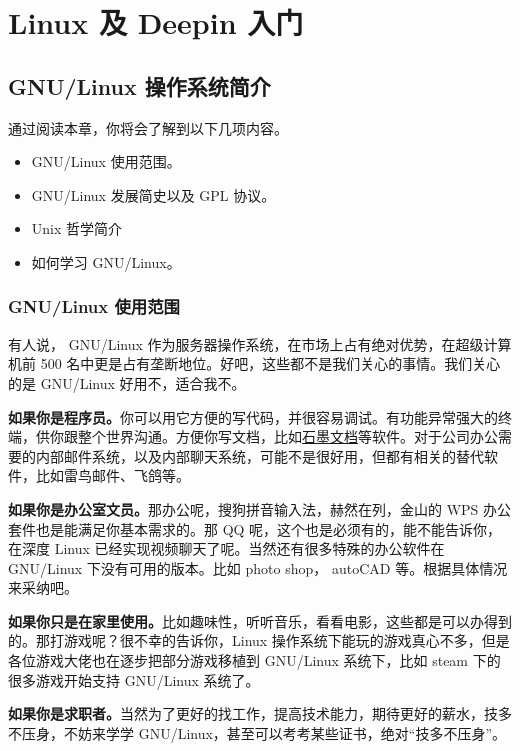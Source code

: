 \documentclass[doctor,openright,twoside]{sjtuthesis}
\providecommand{\tightlist}{%
    \setlength{\itemsep}{0pt}\setlength{\parskip}{0pt}}
\theoremstyle{plain}
\theoremstyle{definition}
\theoremstyle{remark}
\theoremstyle{ocrenumbox}
\theoremstyle{plain}
\newcommand\cqh{“}
\newcommand\cqt{”}
\begin{document}
\hypertarget{part:intro}{%
\part{Linux 及 Deepin 入门}\label{part:intro}}

\hypertarget{chap:linux-intro}{%
\chapter{GNU/Linux 操作系统简介}\label{chap:linux-intro}}

通过阅读本章，你将会了解到以下几项内容。

\begin{itemize}
\tightlist
\item
  GNU/Linux 使用范围。
\item
  GNU/Linux 发展简史以及 GPL 协议。
\item
  Unix 哲学简介
\item
  如何学习 GNU/Linux。
\end{itemize}

\hypertarget{gnulinux-}{%
\section{GNU/Linux 使用范围}\label{gnulinux-}}

有人说， GNU/Linux
作为服务器操作系统，在市场上占有绝对优势，在超级计算机前 500
名中更是占有垄断地位。好吧，这些都不是我们关心的事情。我们关心的是
GNU/Linux 好用不，适合我不。

\textbf{如果你是程序员。}你可以用它方便的写代码，并很容易调试。有功能异常强大的终端，供你跟整个世界沟通。方便你写文档，比如\href{https://shimo.im/}{石墨文档}等软件。对于公司办公需要的内部邮件系统，以及内部聊天系统，可能不是很好用，但都有相关的替代软件，比如雷鸟邮件、飞鸽等。

\textbf{如果你是办公室文员。}那办公呢，搜狗拼音输入法，赫然在列，金山的
WPS 办公套件也是能满足你基本需求的。那 QQ
呢，这个也是必须有的，能不能告诉你，在深度 Linux
已经实现视频聊天了呢。当然还有很多特殊的办公软件在 GNU/Linux
下没有可用的版本。比如 photo shop， autoCAD 等。根据具体情况来采纳吧。

\textbf{如果你只是在家里使用。}比如趣味性，听听音乐，看看电影，这些都是可以办得到的。那打游戏呢？很不幸的告诉你，Linux
操作系统下能玩的游戏真心不多，但是各位游戏大佬也在逐步把部分游戏移植到
GNU/Linux 系统下，比如 steam 下的很多游戏开始支持 GNU/Linux 系统了。

\textbf{如果你是求职者。}当然为了更好的找工作，提高技术能力，期待更好的薪水，技多不压身，不妨来学学
GNU/Linux，甚至可以考考某些证书，绝对\cqh 技多不压身\cqt 。
\end{document}
